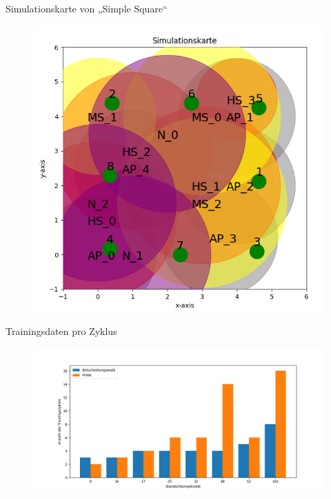 \documentclass[10pt]{beamer}
\begin{document}
\begin{frame}{Simulationskarte von „Simple Square“}
    \begin{figure}
        \centering
        \includegraphics[width=0.75\linewidth]{settings/simple_square_simulation_map.png}
    \end{figure}
\end{frame}

\begin{frame}{Trainingsdaten pro Zyklus}
    \begin{figure}
        \centering
        \includegraphics[width=\linewidth]{location_recognition/required_training_data.png}
    \end{figure}
\end{frame}
\end{document}
